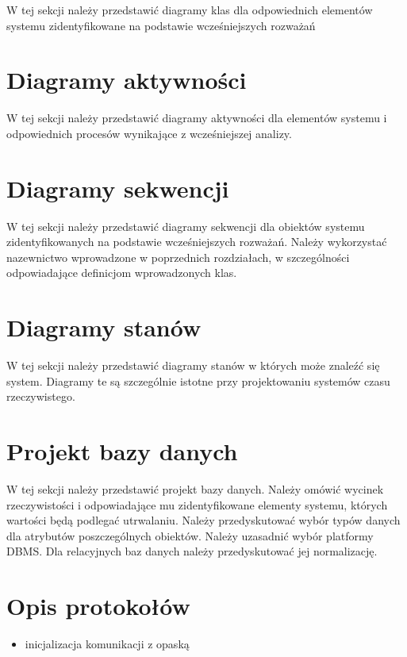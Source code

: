 W tej sekcji należy przedstawić diagramy klas dla odpowiednich elementów systemu zidentyfikowane na podstawie wcześniejszych rozważań

\section{Diagramy aktywności}

W tej sekcji należy przedstawić diagramy aktywności dla elementów systemu i odpowiednich procesów wynikające z wcześniejszej analizy.


\section{Diagramy sekwencji}

W tej sekcji należy przedstawić diagramy sekwencji dla obiektów systemu zidentyfikowanych na podstawie wcześniejszych rozważań. Należy wykorzystać nazewnictwo wprowadzone w poprzednich rozdziałach, w szczególności odpowiadające definicjom wprowadzonych klas.

\section{Diagramy stanów}

W tej sekcji należy przedstawić diagramy stanów w których może znaleźć się system. Diagramy te są szczególnie istotne przy projektowaniu systemów czasu rzeczywistego.

\section{Projekt bazy danych}

W tej sekcji należy przedstawić projekt bazy danych. Należy omówić wycinek rzeczywistości i odpowiadające mu zidentyfikowane elementy systemu, których wartości będą podlegać utrwalaniu. Należy przedyskutować wybór typów danych dla atrybutów poszczególnych obiektów. Należy uzasadnić wybór platformy DBMS. Dla relacyjnych baz danych należy przedyskutować jej normalizację.

\section{Opis protokołów}
\begin{itemize}
    \item inicjalizacja komunikacji z opaską
\end{itemize}

